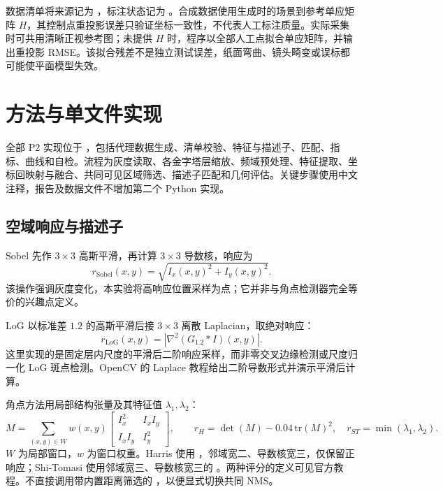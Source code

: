 数据清单将来源记为 ，标注状态记为 。合成数据使用生成时的场景到参考单应矩阵 $H$，其控制点重投影误差只验证坐标一致性，不代表人工标注质量。实际采集时可共用清晰正视参考图；未提供 $H$ 时，程序以全部人工点拟合单应矩阵，并输出重投影 RMSE。该拟合残差不是独立测试误差，纸面弯曲、镜头畸变或误标都可能使平面模型失效。

\section{方法与单文件实现}
全部 P2 实现位于 ，包括代理数据生成、清单校验、特征与描述子、匹配、指标、曲线和自检。流程为灰度读取、各金字塔层缩放、频域预处理、特征提取、坐标回映射与融合、共同可见区域筛选、描述子匹配和几何评估。关键步骤使用中文注释，报告及数据文件不增加第二个 Python 实现。

\subsection{空域响应与描述子}
Sobel 先作 $3\times3$ 高斯平滑，再计算 $3\times3$ 导数核，响应为
\begin{equation}
r_{\mathrm{Sobel}}(x,y)=\sqrt{I_x(x,y)^2+I_y(x,y)^2}.
\end{equation}
该操作强调灰度变化\cite{sobel}，本实验将高响应位置采样为点；它并非与角点检测器完全等价的兴趣点定义。

LoG 以标准差 $1.2$ 的高斯平滑后接 $3\times3$ 离散 Laplacian，取绝对响应：
\begin{equation}
r_{\mathrm{LoG}}(x,y)=\left|\nabla^2(G_{1.2}*I)(x,y)\right|.
\end{equation}
这里实现的是固定层内尺度的平滑后二阶响应采样，而非零交叉边缘检测或尺度归一化 LoG 斑点检测。OpenCV 的 Laplace 教程给出二阶导数形式并演示平滑后计算\cite{laplace}。

角点方法用局部结构张量及其特征值 $\lambda_1,\lambda_2$：
\begin{equation}
M=\sum_{(x,y)\in W}w(x,y)
\begin{bmatrix}I_x^2&I_xI_y\\I_xI_y&I_y^2\end{bmatrix},\qquad
r_H=\det(M)-0.04\,\mathrm{tr}(M)^2,\quad
r_{ST}=\min(\lambda_1,\lambda_2).
\end{equation}
$W$ 为局部窗口，$w$ 为窗口权重。Harris 使用 ，邻域宽二、导数核宽三，仅保留正响应；Shi-Tomasi 使用邻域宽三、导数核宽三的 。两种评分的定义可见官方教程\cite{harris,shi}。不直接调用带内置距离筛选的 ，以便显式切换共同 NMS。

